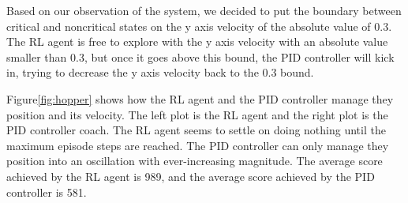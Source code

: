 \documentclass[journal]{IEEEtran}
\begin{document}
Based on our observation of the system, we decided to put the boundary between critical and noncritical states on the y axis velocity of the absolute value of 0.3. The RL agent is free to explore with the y axis velocity with an absolute value smaller than 0.3, but once it goes above this bound, the PID controller will kick in, trying to decrease the y axis velocity back to the 0.3 bound.


Figure\ref{fig:hopper} shows how the RL agent and the PID controller manage they position and its velocity. The left plot is the RL agent and the right plot is the PID controller coach. The RL agent seems to settle on doing nothing until the maximum episode steps are reached. The PID controller can only manage they position into an oscillation with ever-increasing magnitude. The average score achieved by the RL agent is 989, and the average score achieved by the PID controller is 581.
\end{document}
